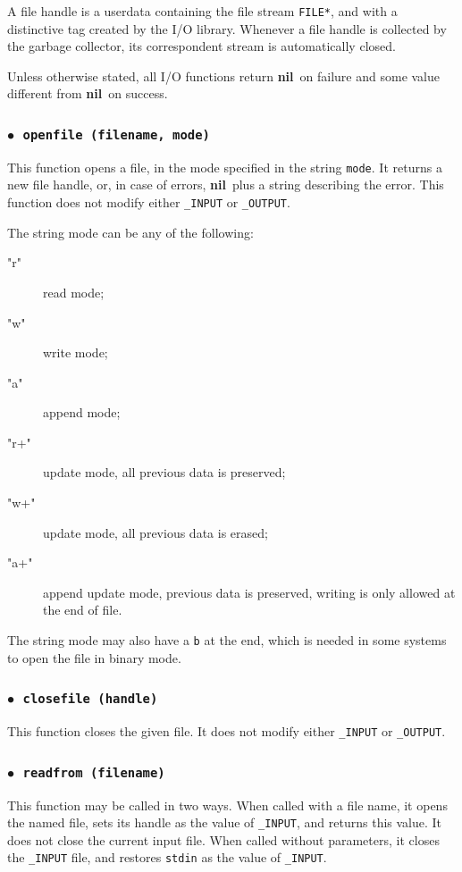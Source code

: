 \documentclass[11pt]{article}
\newcommand{\T}[1]{{\tt #1}}
\newcommand{\nil}{{\bf nil}}
\newcommand{\Deffunc}[1]{\index{#1}}
\newcommand{\ff}{$\bullet$\ }
\begin{document}
A file handle is a userdata containing the file stream \verb|FILE*|,
and with a distinctive tag created by the I/O library.
Whenever a file handle is collected by the garbage collector,
its correspondent stream is automatically closed.

Unless otherwise stated,
all I/O functions return \nil\ on failure and
some value different from \nil\ on success.

\subsubsection*{\ff \T{openfile (filename, mode)}}\Deffunc{openfile}

This function opens a file,
in the mode specified in the string \verb|mode|.
It returns a new file handle,
or, in case of errors, \nil\ plus a string describing the error.
This function does not modify either \verb|_INPUT| or \verb|_OUTPUT|.

The string mode can be any of the following:
\begin{description}
\item["r"] read mode;
\item["w"] write mode;
\item["a"] append mode;
\item["r+"] update mode, all previous data is preserved;
\item["w+"] update mode, all previous data is erased;
\item["a+"] append update mode, previous data is preserved,
  writing is only allowed at the end of file.
\end{description}
The string mode may also have a \verb|b| at the end,
which is needed in some systems to open the file in binary mode.

\subsubsection*{\ff \T{closefile (handle)}}\Deffunc{closefile}

This function closes the given file.
It does not modify either \verb|_INPUT| or \verb|_OUTPUT|.

\subsubsection*{\ff \T{readfrom (filename)}}\Deffunc{readfrom}

This function may be called in two ways.
When called with a file name, it opens the named file,
sets its handle as the value of \verb|_INPUT|,
and returns this value.
It does not close the current input file.
When called without parameters,
it closes the \verb|_INPUT| file,
and restores \verb|stdin| as the value of \verb|_INPUT|.
\end{document}

